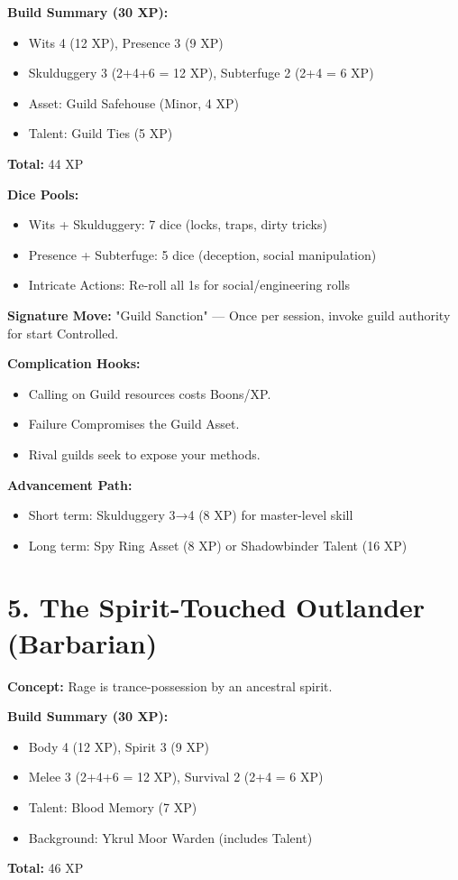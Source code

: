 \begin{itemize}
\textbf{Build Summary (30 XP):}
\begin{itemize}
  \item Wits 4 (12 XP), Presence 3 (9 XP)
  \item Skulduggery 3 (2+4+6 = 12 XP), Subterfuge 2 (2+4 = 6 XP)
  \item Asset: Guild Safehouse (Minor, 4 XP)
  \item Talent: Guild Ties (5 XP)
\end{itemize}
\textbf{Total:} 44 XP

\textbf{Dice Pools:}
\begin{itemize}
  \item Wits + Skulduggery: 7 dice (locks, traps, dirty tricks)
  \item Presence + Subterfuge: 5 dice (deception, social manipulation)
  \item Intricate Actions: Re-roll all 1s for social/engineering rolls
\end{itemize}

\textbf{Signature Move:} "Guild Sanction" — Once per session, invoke guild authority for start Controlled.

\textbf{Complication Hooks:}
\begin{itemize}
  \item Calling on Guild resources costs Boons/XP.
  \item Failure Compromises the Guild Asset.
  \item Rival guilds seek to expose your methods.
\end{itemize}

\textbf{Advancement Path:}
\begin{itemize}
  \item Short term: Skulduggery 3→4 (8 XP) for master-level skill
  \item Long term: Spy Ring Asset (8 XP) or Shadowbinder Talent (16 XP)
\end{itemize}

\section{5. The Spirit-Touched Outlander (Barbarian)}

\textbf{Concept:} Rage is trance-possession by an ancestral spirit.

\textbf{Build Summary (30 XP):}
\begin{itemize}
  \item Body 4 (12 XP), Spirit 3 (9 XP)
  \item Melee 3 (2+4+6 = 12 XP), Survival 2 (2+4 = 6 XP)
  \item Talent: Blood Memory (7 XP)
  \item Background: Ykrul Moor Warden (includes Talent)
\end{itemize}
\textbf{Total:} 46 XP


\end{itemize}
